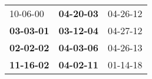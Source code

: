 \begin{supertabular}{p{0.33\columnwidth}p{0.33\columnwidth}p{0.33\columnwidth}}
          10-06-00\textsuperscript{} &  \textbf{04-20-03\textsuperscript{}} &  04-26-12\textsuperscript{} \\
 \textbf{03-03-01\textsuperscript{}} &  \textbf{03-12-04\textsuperscript{}} &  04-27-12\textsuperscript{} \\
 \textbf{02-02-02\textsuperscript{}} &  \textbf{04-03-06\textsuperscript{}} &  04-26-13\textsuperscript{} \\
 \textbf{11-16-02\textsuperscript{}} &  \textbf{04-02-11\textsuperscript{}} &  01-14-18\textsuperscript{} \\
\end{supertabular}
